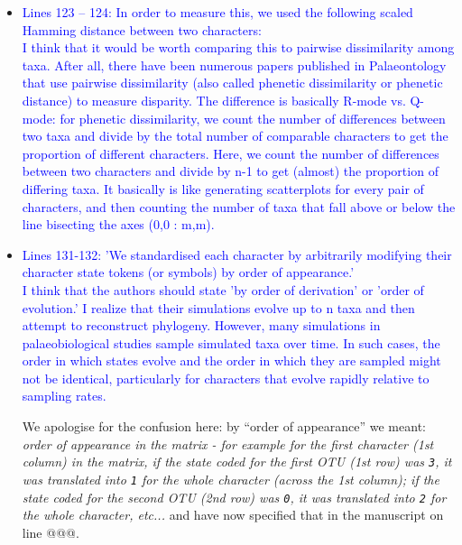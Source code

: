 \documentclass[12pt,letterpaper]{article}
\begin{document}
\begin{itemize}
\item{\textcolor{blue}{Lines 123 – 124: In order to measure this, we used the following scaled Hamming distance between two characters:
\\
I think that it would be worth comparing this to pairwise dissimilarity among taxa. After all, there have been numerous papers published in Palaeontology that use pairwise dissimilarity (also called phenetic dissimilarity or phenetic distance) to measure disparity. The difference is basically R-mode vs. Q-mode: for phenetic dissimilarity, we count the number of differences between two taxa and divide by the total number of comparable characters to get the proportion of different characters. Here, we count the number of differences between two characters and divide by n-1 to get (almost) the proportion of differing taxa. It basically is like generating scatterplots for every pair of characters, and then counting the number of taxa that fall above or below the line bisecting the axes (0,0 : m,m).}}




\item{\textcolor{blue}{Lines 131-132: 'We standardised each character by arbitrarily modifying their character state tokens (or symbols) by order of appearance.'
\\
I think that the authors should state 'by order of derivation' or 'order of evolution.' I realize that their simulations evolve up to n taxa and then attempt to reconstruct phylogeny. However, many simulations in palaeobiological studies sample simulated taxa over time. In such cases, the order in which states evolve and the order in which they are sampled might not be identical, particularly for characters that evolve rapidly relative to sampling rates.}}

We apologise for the confusion here: by ``order of appearance'' we meant:
\textit{order of appearance in the matrix - for example for the first character (1st column) in the matrix, if the state coded for the first OTU (1st row) was \texttt{3}, it was translated into \texttt{1} for the whole character (across the 1st column); if the state coded for the second OTU (2nd row) was \texttt{0}, it was translated into \texttt{2} for the whole character, etc...} and have now specified that in the manuscript on line @@@.




\end{itemize}
\end{document}
